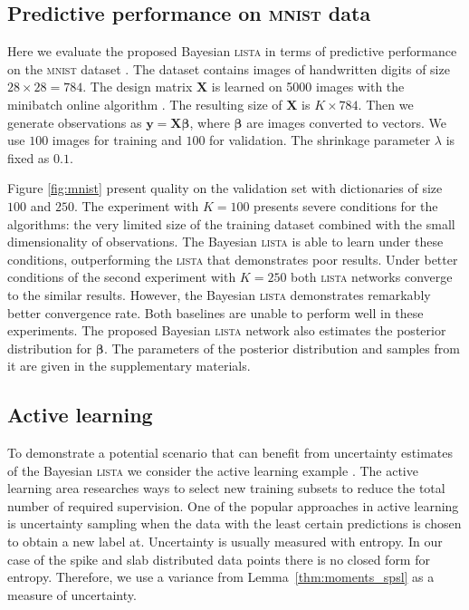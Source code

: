 \documentclass{article}
\begin{document}
\subsection{Predictive performance on \textsc{mnist} data}
Here we evaluate the proposed Bayesian \textsc{lista} in terms of predictive performance on the \textsc{mnist} dataset \citep{lecun1998gradient}. The dataset contains images of handwritten digits of size $28 \times 28 = 784$. The design matrix $\mathbf{X}$ is learned on 5000 images with the minibatch online algorithm \citep{mairal2009online}. The resulting size of $\mathbf{X}$ is $K \times 784$. Then we generate observations as $\mathbf{y} = \mathbf{X}\boldsymbol\beta$, where $\boldsymbol\beta$ are images converted to vectors. We use $100$ images for training and $100$ for validation. The shrinkage parameter $\lambda$ is fixed as $0.1$.

Figure \ref{fig:mnist} present quality on the validation set with dictionaries of size $100$ and $250$.  The experiment with $K=100$ presents severe conditions for the algorithms: the very limited size of the training dataset combined with the small dimensionality of observations. The Bayesian \textsc{lista} is able to learn under these conditions, outperforming the \textsc{lista} that demonstrates poor results. Under better conditions of the second experiment with $K=250$ both \textsc{lista} networks converge to the similar results. However, the Bayesian \textsc{lista} demonstrates remarkably better convergence rate. Both baselines are unable to perform well in these experiments. The proposed Bayesian \textsc{lista} network also estimates the posterior distribution for $\boldsymbol\beta$. The parameters of the posterior distribution and samples from it are given in the supplementary materials.

\subsection{Active learning}
To demonstrate a potential scenario that can benefit from uncertainty estimates of the Bayesian \textsc{lista} we consider the active learning example \citep{settles.tr09}. The active learning area researches ways to select new training subsets to reduce the total number of required supervision. One of the popular approaches in active learning is uncertainty sampling when the data with the least certain predictions is chosen to obtain a new label at. Uncertainty is usually measured with entropy. In our case of the spike and slab distributed data points there is no closed form for entropy. Therefore, we use a variance from Lemma~\ref{thm:moments_spsl} as a measure of uncertainty.
\end{document}
